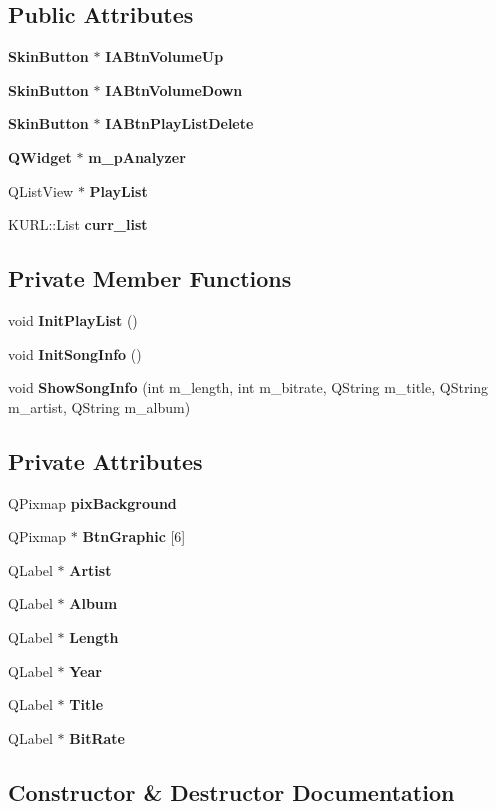 \subsection*{Public Attributes}
\begin{CompactItemize}
\item 
{\bf Skin\-Button} $\ast$ {\bf IABtn\-Volume\-Up}
\item 
{\bf Skin\-Button} $\ast$ {\bf IABtn\-Volume\-Down}
\item 
{\bf Skin\-Button} $\ast$ {\bf IABtn\-Play\-List\-Delete}
\item 
{\bf QWidget} $\ast$ {\bf m\_\-p\-Analyzer}
\item 
QList\-View $\ast$ {\bf Play\-List}
\item 
KURL::List {\bf curr\_\-list}
\end{CompactItemize}
\subsection*{Private Member Functions}
\begin{CompactItemize}
\item 
void {\bf Init\-Play\-List} ()
\item 
void {\bf Init\-Song\-Info} ()
\item 
void {\bf Show\-Song\-Info} (int m\_\-length, int m\_\-bitrate, QString m\_\-title, QString m\_\-artist, QString m\_\-album)
\end{CompactItemize}
\subsection*{Private Attributes}
\begin{CompactItemize}
\item 
QPixmap {\bf pix\-Background}
\item 
QPixmap $\ast$ {\bf Btn\-Graphic} [6]
\item 
QLabel $\ast$ {\bf Artist}
\item 
QLabel $\ast$ {\bf Album}
\item 
QLabel $\ast$ {\bf Length}
\item 
QLabel $\ast$ {\bf Year}
\item 
QLabel $\ast$ {\bf Title}
\item 
QLabel $\ast$ {\bf Bit\-Rate}
\end{CompactItemize}


\subsection{Constructor \& Destructor Documentation}
